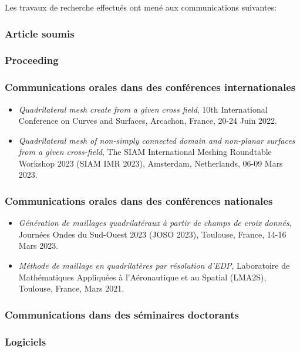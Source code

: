Les travaux de recherche effectués ont mené aux communications suivantes:

\subsubsection{Article soumis}

\subsubsection{Proceeding}

\subsubsection{Communications orales dans des conférences internationales}

\begin{itemize}
    \item \textit{Quadrilateral mesh create from a given cross field}, 10th International Conference on Curves and Surfaces, Arcachon, France, 20-24 Juin 2022.\\
    \item \textit{Quadrilateral mesh of non-simply connected domain and non-planar surfaces from a given cross-field}, The SIAM International Meshing Roundtable Workshop 2023 (SIAM IMR 2023), Amsterdam, Netherlands, 06-09 Mars 2023.
\end{itemize}

\subsubsection{Communications orales dans des conférences nationales}

\begin{itemize}
    \item \textit{Génération de maillages quadrilatéraux à partir de champs de croix donnés}, Journées Ondes du Sud-Ouest 2023 (JOSO 2023), Toulouse, France, 14-16 Mars 2023.\\
    \item \textit{Méthode de maillage en quadrilatères par résolution d'EDP}, Laboratoire de Mathématiques Appliquées à l'Aéronautique et au Spatial (LMA2S), Toulouse, France, Mars 2021.
\end{itemize}



\subsubsection{Communications dans des séminaires doctorants}


\subsubsection{Logiciels}


